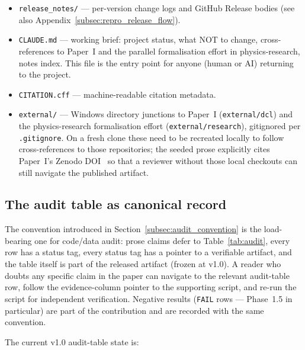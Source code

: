 \begin{itemize}
\item \nolinkurl{release_notes/} --- per-version change logs and
  GitHub Release bodies (see also
  Appendix~\ref{subsec:repro_release_flow}).

\item \nolinkurl{CLAUDE.md} --- working brief: project status,
  what NOT to change, cross-references to Paper~I and the parallel
  formalisation effort in physics-research, notes index.  This
  file is the entry point for anyone (human or AI) returning to
  the project.

\item \nolinkurl{CITATION.cff} --- machine-readable citation
  metadata.

\item \nolinkurl{external/} --- Windows directory junctions to
  Paper~I (\nolinkurl{external/dcl}) and the physics-research
  formalisation effort (\nolinkurl{external/research}), gitignored
  per \nolinkurl{.gitignore}.  On a fresh clone these need to be
  recreated locally to follow cross-references to those
  repositories; the seeded prose explicitly cites Paper~I's
  Zenodo DOI~\cite{menendez2026geometry} so that a reviewer
  without those local checkouts can still navigate the published
  artifact.
\end{itemize}

\subsection{The audit table as canonical record}
\label{subsec:audit_canonical}

The convention introduced in Section~\ref{subsec:audit_convention}
is the load-bearing one for code/data audit: prose claims defer
to Table~\ref{tab:audit}, every row has a status tag, every
status tag has a pointer to a verifiable artifact, and the table
itself is part of the released artifact (frozen at v1.0).  A
reader who doubts any specific claim in the paper can navigate to
the relevant audit-table row, follow the evidence-column pointer
to the supporting script, and re-run the script for independent
verification.  Negative results (\texttt{FAIL} rows --- Phase~1.5
in particular) are part of the contribution and are recorded with
the same convention.

The current v1.0 audit-table state is:

